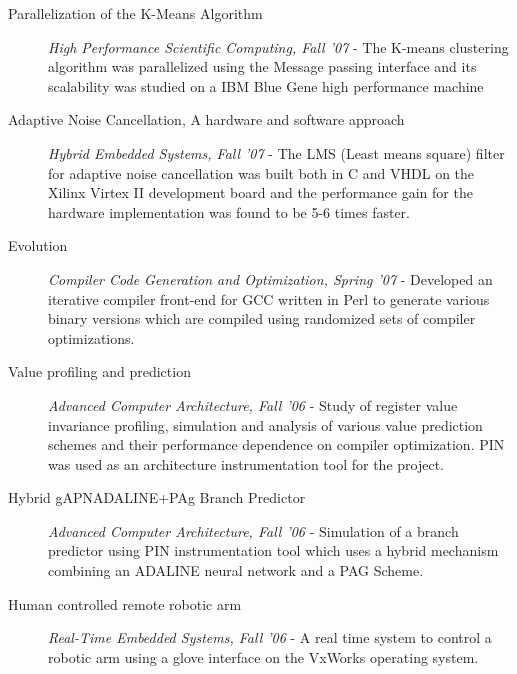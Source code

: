 
\begin{description}

\item[Parallelization of the K-Means Algorithm]
\textit{High Performance Scientific Computing, Fall '07} - The K-means clustering algorithm was parallelized using the Message passing interface and its scalability was studied on a IBM Blue Gene high performance machine

\item[Adaptive Noise Cancellation, A hardware and software approach]
\textit{Hybrid Embedded Systems, Fall '07} - The LMS (Least means square) filter for adaptive noise cancellation was built both in C and VHDL on the Xilinx Virtex II development board and the performance gain for the hardware implementation was found to be 5-6 times faster.


\item[Evolution]
\textit{Compiler Code Generation and Optimization, Spring '07} - Developed an iterative compiler front-end for GCC written in Perl to generate various binary versions which are compiled using randomized sets of compiler optimizations.

\item[Value profiling and prediction]
\textit{Advanced Computer Architecture, Fall '06} - Study of register value invariance profiling, simulation and analysis of various value prediction schemes and their performance dependence on compiler optimization. PIN was used as an architecture instrumentation tool for the project.

\item[Hybrid gAPNADALINE+PAg Branch Predictor]
\textit{Advanced Computer Architecture, Fall '06} - Simulation of a branch predictor using PIN instrumentation tool which uses a hybrid mechanism combining an ADALINE neural network and a PAG Scheme.

\item[Human controlled remote robotic arm]
\textit{Real-Time Embedded Systems, Fall '06} - A real time system to control a robotic arm using a glove interface on the VxWorks operating system.
\end{description}

